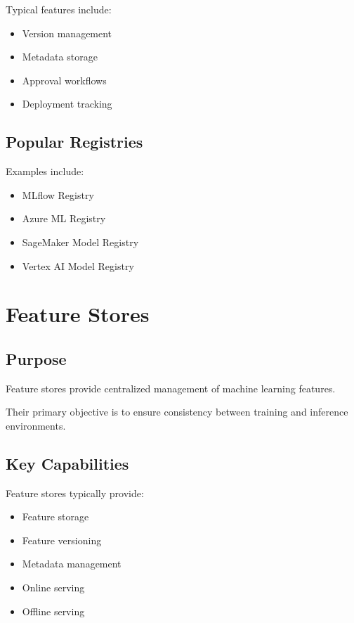 Typical features include:

\begin{itemize}
    \item Version management
    \item Metadata storage
    \item Approval workflows
    \item Deployment tracking
\end{itemize}

\subsection{Popular Registries}

Examples include:

\begin{itemize}
    \item MLflow Registry
    \item Azure ML Registry
    \item SageMaker Model Registry
    \item Vertex AI Model Registry
\end{itemize}

\section{Feature Stores}

\subsection{Purpose}

Feature stores provide centralized management of machine learning features.

Their primary objective is to ensure consistency between training and inference environments.

\subsection{Key Capabilities}

Feature stores typically provide:

\begin{itemize}
    \item Feature storage
    \item Feature versioning
    \item Metadata management
    \item Online serving
    \item Offline serving
\end{itemize}

